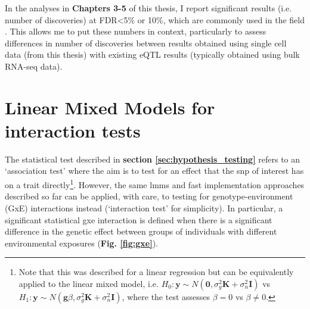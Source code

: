 In the analyses in \textbf{Chapters 3-5} of this thesis, I report significant results (i.e. number of discoveries) at FDR<5\% or 10\%, which are commonly used in the field \cite{kilpinen2017common, gtex2017genetic, aguet2019gtex}.
This allows me to put these numbers in context, particularly to assess differences in number of discoveries between results obtained using single cell data (from this thesis) with existing eQTL results (typically obtained using bulk RNA-seq data).



\section{Linear Mixed Models for interaction tests}
\label{sec:lmm_gxe}

The  statistical test described in \textbf{section \ref{sec:hypothesis_testing}} refers to an `association test' where the aim is to test for an effect that the \gls{snp} of interest has on a trait directly\footnote{Note that this was described for a linear regression but can be equivalently applied to the linear mixed model, i.e. $H_0: \mathbf{y} \sim N (\mathbf{0}, \sigma_g^2\mathbf{K} + \sigma_n^2\mathbf{I})$ vs $H_1: \mathbf{y} \sim N (\mathbf{g}\beta, \sigma_g^2\mathbf{K} + \sigma_n^2\mathbf{I})$, where the test assesses $\beta = 0$ vs $\beta \neq 0$.}.
However, the same \gls{lmm}s and fast implementation approaches described so far can be applied, with care, to testing for genotype-environment (GxE) interactions instead (`interaction test' for simplicity).
In particular, a significant statistical \gls{gxe} interaction is defined when there is a significant difference in the genetic effect between groups of individuals with different environmental exposures (\textbf{Fig. \ref{fig:gxe}}).

